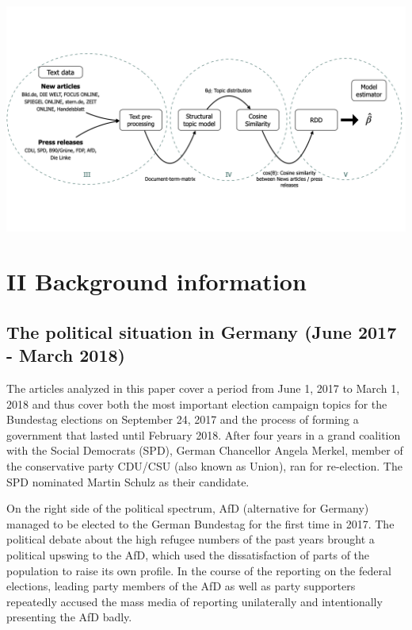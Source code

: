 \documentclass[
]{article}
\begin{document}
\includegraphics{../figs/high_level_overview.png}

\hypertarget{ii-background-information}{%
\section{II Background information}\label{ii-background-information}}

\hypertarget{the-political-situation-in-germany-june-2017---march-2018}{%
\subsection{The political situation in Germany (June 2017 - March
2018)}\label{the-political-situation-in-germany-june-2017---march-2018}}

The articles analyzed in this paper cover a period from June 1, 2017 to
March 1, 2018 and thus cover both the most important election campaign
topics for the Bundestag elections on September 24, 2017 and the process
of forming a government that lasted until February 2018. After four
years in a grand coalition with the Social Democrats (SPD), German
Chancellor Angela Merkel, member of the conservative party CDU/CSU (also
known as Union), ran for re-election. The SPD nominated Martin Schulz as
their candidate.

On the right side of the political spectrum, AfD (alternative for
Germany) managed to be elected to the German Bundestag for the first
time in 2017. The political debate about the high refugee numbers of the
past years brought a political upswing to the AfD, which used the
dissatisfaction of parts of the population to raise its own profile. In
the course of the reporting on the federal elections, leading party
members of the AfD as well as party supporters repeatedly accused the
mass media of reporting unilaterally and intentionally presenting the
AfD badly.
\end{document}
